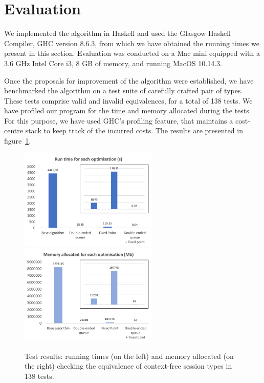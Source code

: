 \section{Evaluation}
\label{sec:evaluation}





We implemented the algorithm
in Haskell and used the Glasgow Haskell Compiler, GHC version 8.6.3,
from which we have obtained the running times we present in this
section.  Evaluation was conducted on a Mac mini equipped with a 3.6
GHz Intel Core i3, 8 GB of memory, and running MacOS 10.14.3.
%

Once the proposals for improvement of the algorithm were established,
we have benchmarked the algorithm on a test suite of carefully crafted 
pair of types. These tests comprise valid and invalid equivalences, 
for a total of 138 tests. We have profiled our program for the
time and memory allocated during the tests. For this purpose,
we have used GHC's profiling feature, that maintains a cost-centre stack
to keep track of the incurred costs. The results are presented 
in figure~\ref{fig:results}.

\begin{figure}[h]
	\includegraphics[height=4.8cm]{img/run_time}	\qquad 
	\includegraphics[height=4.8cm]{img/memory_alloc}	
	\caption{Test results: running times (on the left) and
	memory allocated (on the right) checking the equivalence 
	of context-free session types in 138 tests.}
	\label{fig:results}
\end{figure}

